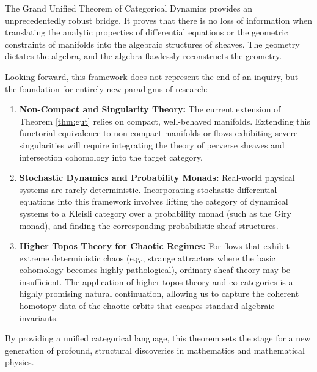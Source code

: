 The Grand Unified Theorem of Categorical Dynamics provides an unprecedentedly robust bridge. It proves that there is no loss of information when translating the analytic properties of differential equations or the geometric constraints of manifolds into the algebraic structures of sheaves. The geometry dictates the algebra, and the algebra flawlessly reconstructs the geometry.

Looking forward, this framework does not represent the end of an inquiry, but the foundation for entirely new paradigms of research:
\begin{enumerate}
    \item \textbf{Non-Compact and Singularity Theory:} The current extension of Theorem \ref{thm:gut} relies on compact, well-behaved manifolds. Extending this functorial equivalence to non-compact manifolds or flows exhibiting severe singularities will require integrating the theory of perverse sheaves and intersection cohomology into the target category.
    \item \textbf{Stochastic Dynamics and Probability Monads:} Real-world physical systems are rarely deterministic. Incorporating stochastic differential equations into this framework involves lifting the category of dynamical systems to a Kleisli category over a probability monad (such as the Giry monad), and finding the corresponding probabilistic sheaf structures.
    \item \textbf{Higher Topos Theory for Chaotic Regimes:} For flows that exhibit extreme deterministic chaos (e.g., strange attractors where the basic cohomology becomes highly pathological), ordinary sheaf theory may be insufficient. The application of higher topos theory and $\infty$-categories is a highly promising natural continuation, allowing us to capture the coherent homotopy data of the chaotic orbits that escapes standard algebraic invariants.
\end{enumerate}

By providing a unified categorical language, this theorem sets the stage for a new generation of profound, structural discoveries in mathematics and mathematical physics.
